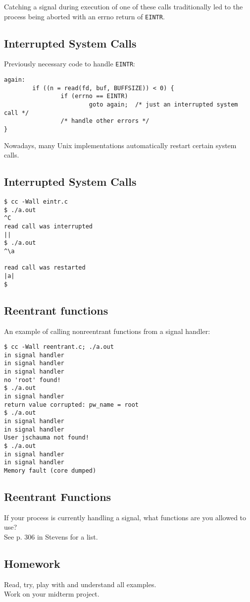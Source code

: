 \documentclass[xga]{xdvislides}
\begin{document}
Catching a signal during execution of one of these calls traditionally led
to the process being aborted with an errno return of {\tt EINTR}.


\subsection{Interrupted System Calls}
Previously necessary code to handle {\tt EINTR}:
\begin{verbatim}
again:
        if ((n = read(fd, buf, BUFFSIZE)) < 0) {
                if (errno == EINTR)
                        goto again;  /* just an interrupted system call */
                /* handle other errors */
}
\end{verbatim}

Nowadays, many Unix implementations automatically restart certain system
calls.

\subsection{Interrupted System Calls}
\begin{verbatim}
$ cc -Wall eintr.c
$ ./a.out
^C
read call was interrupted
||
$ ./a.out
^\a

read call was restarted
|a|
$
\end{verbatim}

\subsection{Reentrant functions}
An example of calling nonreentrant functions from a signal handler:
\begin{verbatim}
$ cc -Wall reentrant.c; ./a.out
in signal handler
in signal handler
in signal handler
no 'root' found!
$ ./a.out
in signal handler
return value corrupted: pw_name = root
$ ./a.out
in signal handler
in signal handler
User jschauma not found!
$ ./a.out
in signal handler
in signal handler
Memory fault (core dumped)
\end{verbatim}

\subsection{Reentrant Functions}

If your process is currently handling a signal, what functions are you allowed
to use? \\

See p. 306 in Stevens for a list.


\subsection{Homework}

Read, try, play with and understand all examples. \\

Work on your midterm project.
\end{document}
